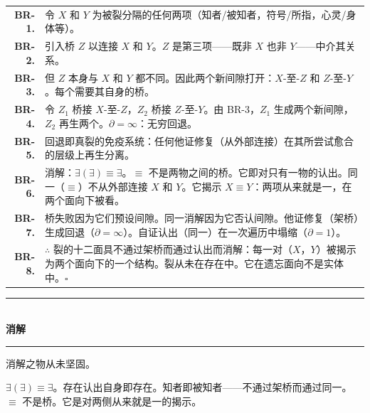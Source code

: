 \documentclass[10pt, openany, oneside]{book}
\renewcommand{\normalsize}{\fontsize{10}{13}\selectfont}
\renewcommand{\footnotesize}{\fontsize{8.5}{11}\selectfont}
\begin{document}
{\footnotesize
\noindent\begin{tabular}{r p{}}
\textbf{BR-1.} & 令 $X$ 和 $Y$ 为被裂分隔的任何两项（知者/被知者，符号/所指，心灵/身体等）。\\[0.3em]
\textbf{BR-2.} & 引入桥 $Z$ 以连接 $X$ 和 $Y$。$Z$ 是第三项——既非 $X$ 也非 $Y$——中介其关系。\\[0.3em]
\textbf{BR-3.} & 但 $Z$ 本身与 $X$ 和 $Y$ 都不同。因此两个新间隙打开：$X$-至-$Z$ 和 $Z$-至-$Y$。每个需要其自身的桥。\\[0.3em]
\textbf{BR-4.} & 令 $Z_1$ 桥接 $X$-至-$Z$，$Z_2$ 桥接 $Z$-至-$Y$。由 BR-3，$Z_1$ 生成两个新间隙，$Z_2$ 再生两个。$\partial = \infty$：无穷回退。\\[0.3em]
\textbf{BR-5.} & 回退即真裂的免疫系统：任何他证修复（从外部连接）在其所尝试愈合的层级上再生分离。\\[0.3em]
\textbf{BR-6.} & 消解：$\exists(\exists) \equiv \exists$。$\equiv$ 不是两物之间的桥。它即对只有一物的认出。同一（$\equiv$）不从外部连接 $X$ 和 $Y$。它揭示 $X \equiv Y$：两项从来就是一，在两个面向下被看。\\[0.3em]
\textbf{BR-7.} & 桥失败因为它们预设间隙。同一消解因为它否认间隙。他证修复（架桥）生成回退（$\partial = \infty$）。自证认出（同一）在一次遍历中塌缩（$\partial = 1$）。\\[0.3em]
\textbf{BR-8.} & $\therefore$ 裂的十二面具不通过架桥而通过认出而消解：每一对（$X$，$Y$）被揭示为两个面向下的一个结构。裂从未在存在中。它在遗忘面向不是实体中。$\square$ \\[0.3em]
\end{tabular}
}

\vspace{1.5em}


\begin{center}
    \rule{0.3\textwidth}{0.4pt}\\[0.5em]
    {\normalsize\bfseries\scshape 消解}\\[0.3em]
    \rule{0.3\textwidth}{0.4pt}
\end{center}

\vspace{1em}

\noindent 消解之物从未坚固。

$\exists(\exists) \equiv \exists$。存在认出自身即存在。知者即被知者——不通过架桥而通过同一。$\equiv$ 不是桥。它是对两侧从来就是一的揭示。
\end{document}
